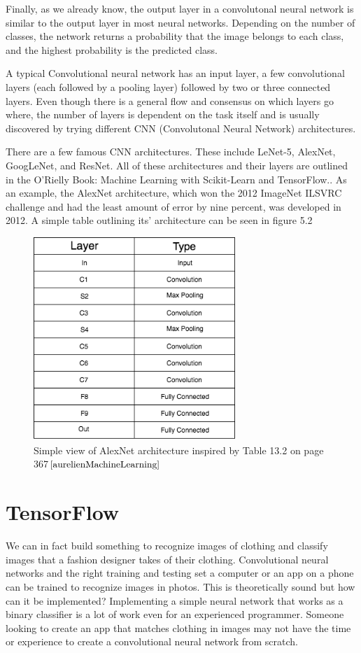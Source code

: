 \documentclass[12pt]{report} %
\begin{document}
	Finally, as we already know, the output layer in a convolutonal neural network is similar to the output layer in most neural networks. Depending on the number of classes, the network returns a probability that the image belongs to each class, and the highest probability is the predicted class. 
	
	A typical Convolutional neural network has an input layer, a few convolutional layers (each followed by a pooling layer) followed by two or three connected layers. Even though there is a general flow and consensus on which layers go where, the number of layers is dependent on the task itself and is usually discovered by trying different CNN (Convolutonal Neural Network) architectures.
	
	There are a few famous CNN architectures. These include LeNet-5, AlexNet, GoogLeNet, and ResNet. All of these architectures and their layers are outlined in the O'Rielly Book: Machine Learning with Scikit-Learn and TensorFlow.\cite{aurelienMachineLearning}. As an example, the AlexNet architecture, which won the 2012 ImageNet ILSVRC challenge and had the least amount of error by nine percent, was developed in 2012. A simple table outlining its' architecture can be seen in figure 5.2
\begin{figure}
\centering
\includegraphics[width=3in]{alex_net_arch}
\caption{Simple view of AlexNet architecture inspired by Table 13.2 on page 367$\cite{aurelienMachineLearning}$}
\end{figure}		

\chapter{TensorFlow}
	We can in fact build something to recognize images of clothing and classify images that a fashion designer takes of their clothing. Convolutional neural networks and the right training and testing set a computer or an app on a phone can be trained to recognize images in photos. This is theoretically sound but how can it be implemented? Implementing a simple neural network that works as a binary classifier is a lot of work even for an experienced programmer. Someone looking to create an app that matches clothing in images may not have the time or experience to create a convolutional neural network from scratch. 
\end{document}
